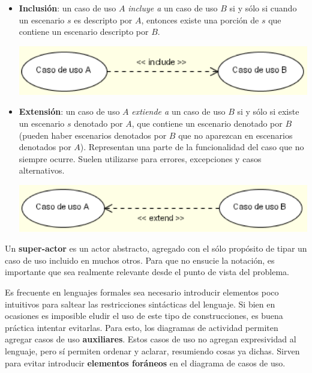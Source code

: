 \documentclass[]{article}
\begin{document}
\begin{itemize}
	\item \textbf{Inclusión}: un caso de uso $A$ \textit{incluye a} un caso de uso $B$ si y sólo si cuando un escenario $s$ es descripto por $A$, entonces existe una porción de $s$ que contiene un escenario descripto por $B$.

	\begin{center}
		\includegraphics[scale=0.5]{Inclus.png}
	\end{center}

	\item \textbf{Extensión}: un caso de uso $A$ \textit{extiende a} un caso de uso $B$ si y sólo si existe un escenario $s$ denotado por $A$, que contiene un escenario denotado por $B$ (pueden haber escenarios denotados por $B$ que no aparezcan en escenarios denotados por $A$). Representan una parte de la funcionalidad del caso que no siempre ocurre. Suelen utilizarse para errores, excepciones y casos alternativos.

	\begin{center}
		\includegraphics[scale=0.5]{Extens.png}
	\end{center}
\end{itemize}

Un \textbf{super-actor} es un actor abstracto, agregado con el sólo propósito de tipar un caso de uso incluido en muchos otros. Para que no ensucie la notación, es importante que sea realmente relevante desde el punto de vista del problema.

Es frecuente en lenguajes formales sea necesario introducir elementos poco intuitivos para saltear las restricciones sintácticas del lenguaje. Si bien en ocasiones es imposible eludir el uso de  este tipo de construcciones, es buena práctica intentar evitarlas. Para esto, los diagramas de actividad permiten agregar casos de uso \textbf{auxiliares}. Estos casos de uso no agregan expresividad al lenguaje, pero sí permiten ordenar y aclarar, resumiendo cosas ya dichas. Sirven para evitar introducir \textbf{elementos foráneos} en el diagrama de casos de uso.
\end{document}

